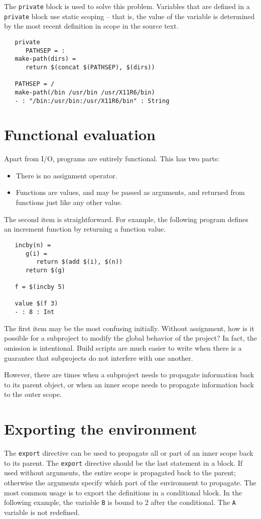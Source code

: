 The \verb+private+ block is used to solve this problem.  Variables
that are defined in a \verb+private+ block use static scoping -- that
is, the value of the variable is determined by the most recent
definition in scope in the source text.

\begin{verbatim}
   private
      PATHSEP = :
   make-path(dirs) =
      return $(concat $(PATHSEP), $(dirs))

   PATHSEP = /
   make-path(/bin /usr/bin /usr/X11R6/bin)
   - : "/bin:/usr/bin:/usr/X11R6/bin" : String
\end{verbatim}

\section{Functional evaluation}

Apart from I/O,  programs are entirely functional.  This has two parts:

\begin{itemize}
\item There is no assignment operator.
\item Functions are values, and may be passed as arguments, and returned from
      functions just like any other value.
\end{itemize}

The second item is straightforward.  For example, the following program defines
an increment function by returning a function value.

\begin{verbatim}
   incby(n) =
      g(i) =
         return $(add $(i), $(n))
      return $(g)

   f = $(incby 5)

   value $(f 3)
   - : 8 : Int
\end{verbatim}

The first item may be the most confusing initially.  Without assignment, how is
it possible for a subproject to modify the global behavior of the project?  In fact,
the omission is intentional.  Build scripts are much easier to write when there
is a guarantee that subprojects do not interfere with one another.

However, there are times when a subproject needs to propagate
information back to its parent object, or when an inner scope needs to
propagate information back to the outer scope.

\section{Exporting the environment}
\label{section:export}
The \verb+export+ directive can be used to propagate all or part of an inner scope back to its
parent.  The \verb+export+ directive should be the last statement in a block.  If used without
arguments, the entire scope is propagated back to the parent; otherwise the arguments specify which
part of the environment to propagate.  The most common usage is to export the definitions in a
conditional block.  In the following example, the variable \verb+B+ is bound to 2 after the
conditional.  The \verb+A+ variable is not redefined.

